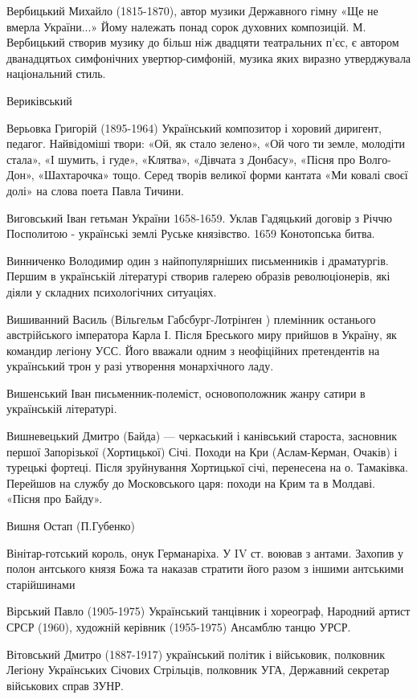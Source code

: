 Вербицький Михайло  (1815-1870), автор музики Державного гімну «Ще не вмерла України...» Йому належать понад сорок духовних композицій. М. Вербицький створив музику до більш ніж двадцяти театральних п’єс, є автором дванадцятьох симфонічних увертюр-симфоній, музика яких виразно утверджувала національний стиль. 

Вериківський

Верьовка Григорій (1895-1964) Український композитор і хоровий диригент, педагог. Найвідоміші твори: «Ой, як стало зелено», «Ой чого ти земле, молодіти стала», «І шумить, і гуде», «Клятва», «Дівчата з Донбасу», «Пісня про Волго-Дон», «Шахтарочка» тощо. Серед творів великої форми кантата «Ми ковалі своєї долі» на слова поета Павла Тичини.

Виговський  Іван гетьман України 1658-1659. Уклав Гадяцький договір з Річчю Посполитою - українські землі Руське князівство. 1659 Конотопська битва.

Винниченко Володимир один з найпопулярніших письменників і драматургів. Першим в українській літературі створив галерею образів революціонерів, які діяли у складних психологічних ситуаціях. 

Вишиванний Василь (Вільгельм  Габсбург-Лотрінґен ) племінник останього австрійського імператора Карла І. Після Бреського миру прийшов в Україну, як командир легіону УСС. Його вважали одним з неофіційних претендентів на український трон у разі утворення монархічного ладу.   

Вишенський  Іван письменник-полеміст, основоположник жанру сатири в українській літературі.

Вишневецький Дмитро  (Байда) --- черкаський і канівський староста, засновник першої Запорізької (Хортицької) Січі. Походи на Кри (Аслам-Керман, Очаків) і турецькі фортеці. Після зруйнування Хортицької січі, перенесена на о. Тамаківка. Перейшов на службу до Московського царя: походи на Крим та в Молдаві. «Пісня про Байду».

Вишня Остап (П.Губенко) 

Вінітар-готський король, онук Германаріха. У IV ст. воював з антами. Захопив у полон антського князя Божа та наказав стратити його разом з іншими антськими старійшинами

Вірський Павло (1905-1975) Український танцівник і хореограф, Народний артист СРСР (1960), художній керівник (1955-1975) Ансамблю танцю УРСР.

Вітовський Дмитро (1887-1917) український політик і військовик, полковник Легіону Українських Січових Стрільців, полковник УГА, Державний секретар військових справ ЗУНР. 

